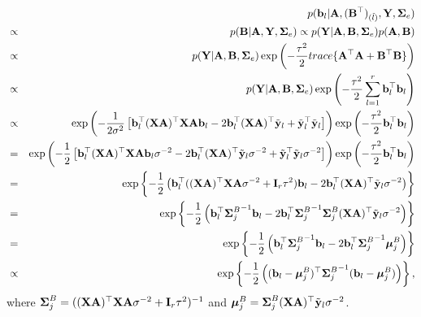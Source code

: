 \documentclass[]{book}
\begin{document}
\begin{eqnarray*}
        &&p({\bf b}_l|{\bf A},({\bf B}^{{\top}})_{(\tilde{l})},{\bf Y},{\boldsymbol \Sigma}_e)\\
        &\propto& p({\bf B}|{\bf A},{\bf Y},{\boldsymbol \Sigma}_e)
        \propto p({\bf Y}|{\bf A},{\bf B},{\boldsymbol \Sigma}_e)p({\bf A},{\bf B})\\
        &\propto & p({\bf Y}|{\bf A},{\bf B},{\boldsymbol \Sigma}_e) \exp \left(-\frac{\tau^2}{2} trace\{ {\bf A}^{{\top}}{\bf A}+{\bf B}^{{\top}}{\bf B}\}\right) \\
        &\propto& p({\bf Y}|{\bf A},{\bf B},{\boldsymbol \Sigma}_e) \exp \left(-\frac{\tau^2}{2} \sum_{l=1}^{r}{\bf b}_l^{{\top}}{\bf b}_l\right)\\
        &\propto& \exp\left(-\frac{1}{2\sigma^2}\left[{\bf b}_{l}^{{\top}} ({\bf X}{\bf A})^{{\top}}{\bf X}{\bf A}{\bf b}_{l}-
        2{\bf b}_{l}^{{\top}}({\bf X}{\bf A})^{{\top}}\tilde{{\bf y}}_l+\tilde{{\bf y}}_l^{{\top}}\tilde{{\bf y}}_l\right]\right)
        \exp \left(-\frac{\tau^2}{2}{\bf b}_l^{{\top}}{\bf b}_l\right)\\
        &=& \exp\left(-\frac{1}{2}\left[{\bf b}_{l}^{{\top}} ({\bf X}{\bf A})^{{\top}}{\bf X}{\bf A}{\bf b}_{l}\sigma^{-2}-
        2{\bf b}_{l}^{{\top}}({\bf X}{\bf A})^{{\top}}\tilde{{\bf y}}_l\sigma^{-2}+
        \tilde{{\bf y}}_l^{{\top}}\tilde{{\bf y}}_l\sigma^{-2}\right]\right)
        \exp \left(-\frac{\tau^2}{2}{\bf b}_l^{{\top}}{\bf b}_l\right)\\
        &=& \exp\left\{-\frac{1}{2}\left({\bf b}_{l}^{{\top}}( ({\bf X}{\bf A})^{{\top}}{\bf X}{\bf A}\sigma^{-2}+{\bf I}_r\tau^2){\bf b}_{l}-
        2{\bf b}_{l}^{{\top}}({\bf X}{\bf A})^{{\top}}\tilde{{\bf y}}_l\sigma^{-2}\right)\right\}\\
        &=& \exp\left\{-\frac{1}{2}\left({\bf b}_{l}^{{\top}}{{\boldsymbol \Sigma}_j^B}^{-1}{\bf b}_{l}-
        2{\bf b}_{l}^{{\top}}{{\boldsymbol \Sigma}_j^B}^{-1}{{\boldsymbol \Sigma}_j^B}({\bf X}{\bf A})^{{\top}}\tilde{{\bf y}}_l\sigma^{-2}\right)\right\}\\
        &=& \exp\left\{-\frac {1}{2}\left({\bf b}_{l}^{{\top}}{{\boldsymbol \Sigma}_j^B}^{-1}{\bf b}_{l}-
        2{\bf b}_{l}^{{\top}}{{\boldsymbol \Sigma}_j^B}^{-1}{\boldsymbol \mu}_j^B\right)\right\}\\
        &\propto& \exp\left\{-\frac{1}{2}\left(({\bf b}_{l}-{\boldsymbol \mu}_j^B)^{{\top}}{{\boldsymbol \Sigma}_j^B}^{-1}({\bf b}_{l}-{\boldsymbol \mu}_j^B)
        \right)\right\},
\end{eqnarray*}
where \({\boldsymbol \Sigma}_j^B= (({\bf X}{\bf A})^{{\top}}{\bf X}{\bf A}\sigma^{-2}+{\bf I}_r\tau^2)^{-1}\) and \({\boldsymbol \mu}_j^B={{\boldsymbol \Sigma}_j^B}({\bf X}{\bf A})^{{\top}}\tilde{{\bf y}}_l\sigma^{-2}\).
\end{document}
